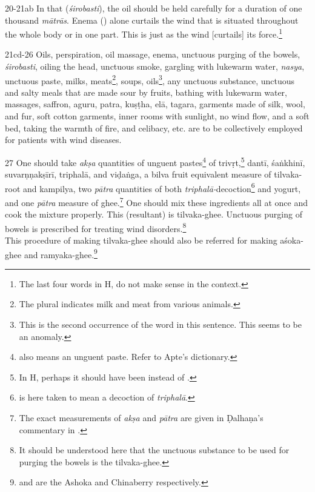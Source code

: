 \begin{translation}
{\begin{tt}
    \item[20-21ab]
    In that (\textit{śirobasti}), the oil should be held carefully for a duration of 
    one thousand \textit{mātrās}. Enema () alone curtails the wind 
    that is situated throughout the whole body or in one part. This is just as the 
    wind [curtails] its force.\footnote{The last four words in H,  do not make sense in the context.} 

    \item[21cd-26]
    Oils, perspiration, oil massage, enema, unctuous purging of the bowels, 
    \textit{śirobasti}, oiling the head, unctuous smoke, gargling with lukewarm 
    water, \textit{nasya}, unctuous paste, milks, 
    meats\footnote{The plural indicates milk and meat from various animals.}, 
    soups, oils\footnote{This is the second occurrence of the word 
     in this sentence. This seems to be an anomaly.}, any 
    unctuous substance, unctuous and salty meals that are made sour by fruits, 
    bathing with lukewarm water, massages, saffron, \gls{aguru}, \gls{patra}, 
    \gls{kuṣṭha}, \gls{elā}, \gls{tagara}, garments made of silk, wool, and fur, 
    soft cotton garments, inner rooms with sunlight, no wind flow, and a soft 
    bed, taking the warmth of fire, and celibacy, etc. are to be collectively 
    employed for patients with wind diseases.    

    \item[27]
    One should take \textit{akṣa} quantities of unguent 
    pastes\footnote{ also means an unguent paste. Refer to Apte's 
    dictionary.} of \gls{trivṛt},\footnote{In H, perhaps it should have been 
     instead of .} \gls{dantī}, \gls{śaṅkhinī}, 
    \gls{suvarṇṇakṣīrī}, \gls{triphalā}, and \gls{viḍaṅga}, a \gls{bilva} fruit 
    equivalent measure of \gls{tilvaka}-root and \gls{kampilya}, two 
    \textit{pātra} quantities of both 
    \textit{triphalā-}decoction\footnote{ is here taken to 
    mean 
    a decoction of \textit{triphalā}.} and yogurt, and one \textit{pātra} 
    measure 
    of ghee.\footnote{The exact measurements of \textit{akṣa} and 
    \textit{pātra} 
    are given in Ḍalhaṇa's commentary in \cite[422]{vulgate}.} One should mix 
    these ingredients all at once and cook the mixture properly. This (resultant) 
    is 
    \gls{tilvaka}-ghee. Unctuous purging of bowels is prescribed for treating 
    wind 
    disorders.\footnote{It should be understood here that the unctuous 
    substance 
    to be used for purging the bowels is the \gls{tilvaka}-ghee.}\\
    This procedure of making \gls{tilvaka}-ghee should also be referred for 
    making \gls{aśoka}-ghee and \gls{ramyaka}-ghee.\footnote{ 
    and  are the Ashoka and Chinaberry respectively.}


\end{tt}}
\end{translation}
